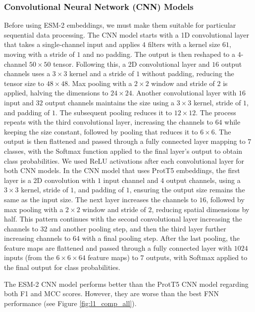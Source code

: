 \documentclass{bioinfo}
\begin{document}
\subsubsection{Convolutional Neural Network (CNN) Models}
Before using ESM-2 embeddings, we must make them suitable for particular sequential data processing. 
The CNN model starts with a 1D convolutional layer that takes a single-channel input and applies $4$ filters with a kernel size $61$,
moving with a stride of $1$ and no padding. The output is then reshaped to a $4$-channel $50\times50$ tensor. 
Following this, a 2D convolutional layer and $16$ output channels uses a $3\times3$ kernel and a stride of $1$ without padding,
reducing the tensor size to $48 \times 48$. Max pooling with a $2\times2$ window and stride of $2$ is applied, 
halving the dimensions to $24\times24$. Another convolutional layer with $16$ input and $32$ output channels maintains the size using a 
$3\times3$ kernel, stride of $1$, and padding of $1$. The subsequent pooling reduces it to $12\times12$. 
The process repeats with the third convolutional layer, increasing the channels to $64$ while keeping the size constant, 
followed by pooling that reduces it to $6\times6$. The output is then flattened and passed through a fully connected layer mapping to 
$7$ classes, with the Softmax function applied to the final layer’s output to obtain class probabilities.
We used ReLU activations after each convolutional layer for both CNN models. 
In the CNN model that uses ProtT5 embeddings, the first layer is a 2D convolution with $1$ 
input channel and $4$ output channels, using a $3\times3$ kernel, stride of $1$, and padding of $1$,
ensuring the output size remains the same as the input size. 
The next layer increases the channels to $16$, followed by max pooling with a $2\times2$ window and stride of $2$, 
reducing spatial dimensions by half. This pattern continues with the second convolutional layer increasing 
the channels to $32$ and another pooling step, and then the third layer further increasing channels to $64$
with a final pooling step. After the last pooling, the feature maps are flattened and passed through a fully connected layer 
with $1024$ inputs (from the $6\times6\times64$ feature maps) to $7$ outputs, 
with Softmax applied to the final output for class probabilities. 

The ESM-2 CNN model performs better than the ProtT5 CNN model regarding both F1 and MCC scores. 
However, they are worse than the best FNN performance (see Figure \ref{fig:l1_comp_all}). 
\end{document}

